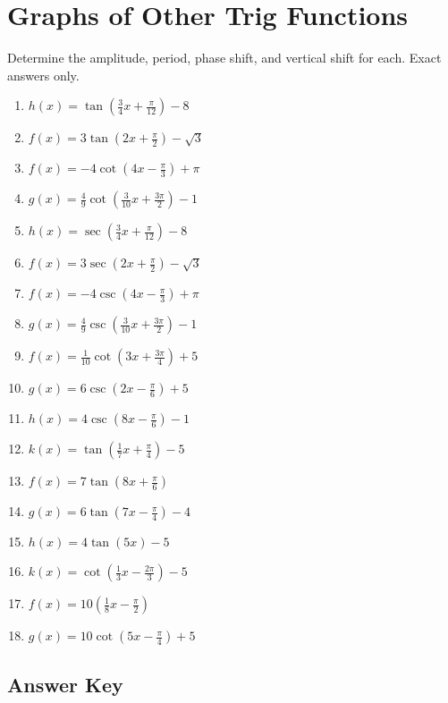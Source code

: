 \chapter{Graphs of Other Trig Functions}

Determine the amplitude, period, phase shift, and vertical shift for each. Exact answers only.

\begin{multicols}{2}
\begin{enumerate}
	\item $h(x) = \tan\left(\frac{3}{4}x + \frac{\pi}{12}\right) - 8$
	\item $f(x)=3\tan\left(2x+\frac{\pi}{2}\right)-\sqrt{3}$
	\item $f(x) = -4\cot\left(4x-\frac{\pi}{3}\right) + \pi$
	\item $g(x) = \frac{4}{9}\cot\left(\frac{3}{10}x + \frac{3\pi}{2}\right) - 1$
	\item $h(x) = \sec\left(\frac{3}{4}x + \frac{\pi}{12}\right) - 8$
	\item $f(x)=3\sec\left(2x+\frac{\pi}{2}\right)-\sqrt{3}$
	\item $f(x) = -4\csc\left(4x-\frac{\pi}{3}\right) + \pi$
	\item $g(x) = \frac{4}{9}\csc\left(\frac{3}{10}x + \frac{3\pi}{2}\right) - 1$
	\item $f(x) = \frac{1}{10}\cot\left(3x+\frac{3\pi}{4}\right) + 5$
	\item $g(x) = 6\csc\left(2x-\frac{\pi}{6}\right)+5$
	\item $h(x) = 4\csc\left(8x-\frac{\pi}{6}\right)-1$
	\item $k(x) = \tan\left(\frac{1}{7}x+\frac{\pi}{4}\right)-5$
	\item $f(x) = 7\tan\left(8x+\frac{\pi}{6}\right)$
	\item $g(x) = 6\tan\left(7x-\frac{\pi}{4}\right)-4$
	\item $h(x) = 4\tan(5x)-5$
	\item $k(x) = \cot\left(\frac{1}{3}x-\frac{2\pi}{3}\right)-5$
	\item $f(x) = 10\left(\frac{1}{8}x-\frac{\pi}{2}\right)$
	\item $g(x) = 10\cot\left(5x-\frac{\pi}{4}\right)+5$
\end{enumerate}
\end{multicols}

\newpage

\section{Answer Key}

